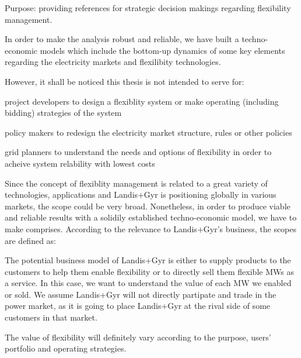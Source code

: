 \documentclass[a4paper,11pt,twoside,onecolumn]{book}
\begin{document}
Purpose: providing references for strategic decision makings regarding flexibility management.

In order to make the analysis robust and reliable, we have built a techno-economic models which include the bottom-up dynamics of some key elements regarding the electricity markets and flexilibity technologies. 

However, it shall be noticed this thesis is not intended to serve for:

project developers to design a flexiblity system or make operating (including bidding) strategies of the system

policy makers to redesign the electricity market structure, rules or other policies

grid planners to understand the needs and options of flexibility in order to acheive system relability with lowest costs


Since the concept of flexiblity management is related to a great variety of technologies, applications and Landis+Gyr is positioning globally in various markets, the scope could be very broad. Nonetheless, in order to produce viable and reliable results with a solidily established techno-economic model, we have to make comprises. According to the relevance to Landis+Gyr's business, the scopes are defined as:



The potential business model of Landis+Gyr is either to supply products to the customers to help them enable flexibility or to directly sell them flexible MWs as a service. In this case, we want to understand the value of each MW we enabled or sold. We assume Landis+Gyr will not directly partipate and trade in the power market, as it is going to place Landis+Gyr at the rival side of some customers in that market.

The value of flexibility will definitely vary according to the purpose, users' portfolio and operating strategies. 
\end{document}
